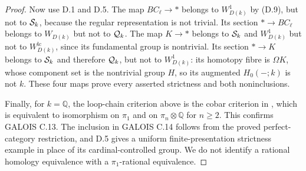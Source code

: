 \begin{proof}
Now use D.1 and D.5. The map $BC_\ell\to *$ belongs to $W^1_{D(k)}$
by (D.9), but not to $\mathcal S_k$, because the regular representation is
not trivial. Its section $*\to BC_\ell$ belongs to $W_{D(k)}$ but
not to $\mathcal Q_k$. The map $K\to *$ belongs to $\mathcal S_k$ and $W^1_{D(k)}$
but not to $W^{\mathrm{lc}}_{D(k)}$, since its fundamental group is
nontrivial. Its section $*\to K$ belongs to $\mathcal S_k$ and therefore
$\mathcal Q_k$, but not to $W^1_{D(k)}$: its homotopy fibre is $\Omega K$,
whose component set is the nontrivial group $H$, so its augmented
$H_0(-;k)$ is not $k$. These four maps prove every asserted
strictness and both noninclusions.

Finally, for $k=\mathbb Q$, the loop-chain criterion above is the
cobar criterion in \citet[Theorem 3]{D_RiveraWierstraZeinalian2021},
which is equivalent to isomorphism on $\pi_1$ and on
$\pi_n\otimes\mathbb Q$ for $n\geq2$. This confirms GALOIS C.13.
The inclusion in GALOIS C.14 follows from the proved perfect-category
restriction, and D.5 gives a uniform finite-presentation strictness
example in place of its cardinal-controlled group. We do not identify
a rational homology equivalence with a $\pi_1$-rational equivalence.
\end{proof}

